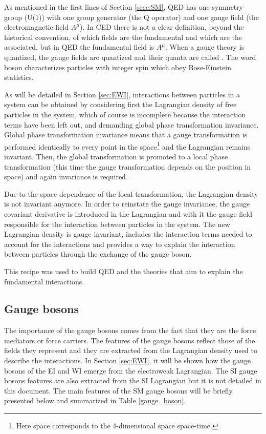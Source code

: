 As mentioned in the first lines of Section \ref{secc:SM}, QED has one symmetry group (U(1)) with one group generator (the Q operator) and one gauge field (the electromagnetic field $A^\mu$). In CED there is not a clear definition, beyond the historical convention, of which fields are the fundamental and which are the associated, but in QED the fundamental field is $A^\mu$. When a gauge theory is quantized, the gauge fields are quantized and their quanta are called . The word boson characterizes particles with integer spin which obey Bose-Einstein statistics.     

As will be detailed in Section \ref{sec:EWI}, interactions between particles in a system can be obtained by considering first the Lagrangian density of free particles in the system, which of course is incomplete because the interaction terms have been left out, and demanding global phase transformation invariance. Global phase transformation invariance means that a gauge transformation is performed identically to every point in the space\footnote{Here space corresponds to the 4-dimensional space \ie space-time.} and the Lagrangian remains invariant. Then, the global transformation is promoted to a local phase transformation (this time the gauge transformation depends on the position in space) and again invariance is required.

Due to the space dependence of the local transformation, the Lagrangian density is not invariant anymore. In order to reinstate the gauge invariance, the gauge covariant derivative is introduced in the Lagrangian and with it the gauge field responsible for the interaction between particles in the system. The new Lagrangian density is gauge invariant, includes the interaction terms needed to account for the interactions and provides a way to explain the interaction between particles through the exchange of the gauge boson.

This recipe was used to build QED and the theories that aim to explain the fundamental interactions.   

\subsection{Gauge bosons}\label{sec:gb}

The importance of the gauge bosons comes from the fact that they are the force mediators or force carriers. The features of the gauge bosons reflect those of the fields they represent and they are extracted from the Lagrangian density used to describe the interactions. In Section \ref{sec:EWI}, it will be shown how the gauge bosons of the EI and WI emerge from the electroweak Lagrangian. The SI gauge bosons features are also extracted from the SI Lagrangian but it is not detailed in this document. The main features of the SM gauge bosons will be briefly presented below and summarized in Table \ref{gauge_boson}.

